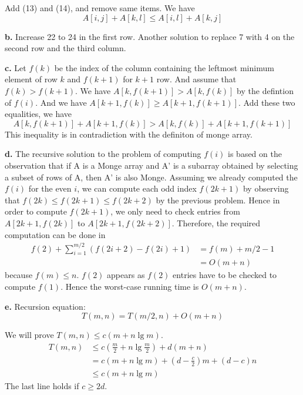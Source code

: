 \documentclass{book}
\begin{document}
\begin{CJK}{UTF8}{gkai}
Add (13) and (14),  and remove same items. We have
\begin{equation}
A[i,j] + A[k,l] \le A[i,l] + A[k,j]
\end{equation}

\textbf{b.} Increase 22 to 24 in the first row. Another solution to replace 7 
with 4 on the second row and the third column.

\textbf{c.} Let $f(k)$ be the index of the column containing the leftmost 
minimum element of row $k$ and $f(k+1)$ for $k+1$ row. And assume that $f(k) > 
f(k+1)$. We have $A[k, f(k+1)] > A[k, f(k)]$ by the defintion of $f(i)$. And we 
have $A[k+1, f(k)] \ge A[k+1, f(k+1)]$. Add these two equalities, we have
\begin{equation*}
A[k, f(k+1)] + A[k+1, f(k)] > A[k, f(k)] + A[k+1, f(k+1)]
\end{equation*}
This inequality is in contradiction with the definiton of monge array.

\textbf{d.}
The recursive solution to the problem of computing $f(i)$ is based on the 
observation that if A is a Monge array and A' is a subarray obtained by 
selecting a subset of rows of A, then A' is also Monge. Assuming we already 
computed the $f(i)$ for the even $i$, we can compute each odd index $f(2k+1)$ by 
observing that
$f(2k) \le f(2k + 1) \le f(2k + 2)$ by the previous problem.  Hence in order to 
compute $f(2k+1)$, we only need to check entries from $A[2k + 1, f(2k)]$ to 
$A[2k + 1, f(2k+2)]$. Therefore, the required computation can be done in
\begin{align*}
f(2) + \sum_{i=1}^{m/2} (f(2i+2)-f(2i)+1) & = f(m) + m/2 -1 \\
&  = O(m+n)
\end{align*}
because $f(m) \le n$. $f(2)$ appears as $f(2)$ entries have to be checked to 
compute $f(1)$.  Hence the worst-case running time is $O(m + n)$.  

\textbf{e.} Recursion equation:
\begin{equation*}
T(m,n) = T(m/2, n) + O(m+n)
\end{equation*}

We will prove $T(m,n) \le c(m+n\lg m)$.
\begin{align*}
T(m,n) & \le c(\frac{m}{2}+n\lg\frac{m}{2}) + d(m+n) \\
& = c(m+n\lg m) + (d-\frac{c}{2})m + (d-c)n \\
& \le c(m+n\lg m)
\end{align*}
The last line holds if $c\ge 2d$.


\end{CJK}
\end{document}
